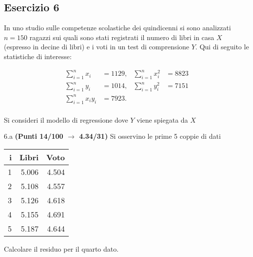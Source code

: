 \documentclass[
  11pt,
]{book}
\theoremstyle{mytheoremstyle}
\theoremstyle{mydefstyle}
\begin{document}
\subsection{Esercizio 6}\label{esercizio-6-2}

In uno studio sulle competenze scolastiche dei quindicenni si sono analizzati \(n=150\) ragazzi sui quali sono stati registrati il numero di libri in casa \(X\) (espresso in decine di libri) e i voti in un test di comprensione \(Y\). Qui di seguito le statistiche di interesse:

\begin{align*}
\sum_{i=1}^n x_i &= 1129,   &\sum_{i=1}^n x_i^2 &= 8823 \\
\sum_{i=1}^n y_i &= 1014,   &\sum_{i=1}^n y_i^2 &= 7151 \\
\sum_{i=1}^n x_iy_i &= 7923.    \\
\end{align*}

Si consideri il modello di regressione dove \(Y\) viene spiegata da \(X\)

6.a \textbf{(Punti 14/100 \(\rightarrow\) 4.34/31)} Si osservino le prime 5 coppie di dati

\begin{table}[H]
\centering
\begin{tabular}{rrr}
\toprule
i & Libri & Voto\\
\midrule
1 & 5.006 & 4.504\\
2 & 5.108 & 4.557\\
3 & 5.126 & 4.618\\
4 & 5.155 & 4.691\\
5 & 5.187 & 4.644\\
\bottomrule
\end{tabular}
\end{table}

Calcolare il residuo per il quarto dato.
\end{document}
